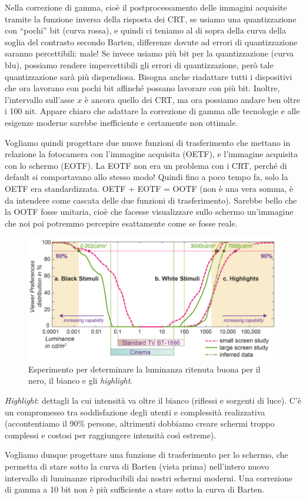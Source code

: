 \documentclass[a4paper,11pt]{article}
\begin{document}
Nella correzione di gamma, cioè il postprocessamento delle immagini acquisite tramite la funzione inversa della risposta dei CRT,
se usiamo una quantizzazione con ``pochi'' bit (curva rossa), e quindi ci teniamo al di sopra della curva della soglia del contrasto secondo Barten,
differenze dovute ad errori di quantizzazione saranno percettibili: male!
Se invece usiamo più bit per la quantizzazione (curva blu), possiamo rendere impercettibili gli errori di quantizzazione, però tale quantizzazione
sarà più dispendiosa. Bisogna anche riadattare tutti i dispositivi che ora lavorano con pochi bit
affinché possano lavorare con più bit. Inoltre, l'intervallo sull'asse $x$ è ancora quello dei CRT, ma ora possiamo andare ben oltre i 100 nit. Appare chiaro che adattare
la correzione di gamma alle tecnologie e alle esigenze moderne sarebbe inefficiente e certamente non ottimale.
\par
Vogliamo quindi progettare due nuove funzioni di trasferimento che mettano in relazione la fotocamera con l'immagine acquisita (OETF),
e l'immagine acquisita con lo schermo (EOTF). La EOTF non era un problema con i CRT,
perché di default si comportavano allo stesso modo! Quindi fino a poco tempo fa, solo la OETF era standardizzata.
OETF + EOTF = OOTF (non è una vera somma, è da intendere come cascata delle due funzioni di trasferimento).
Sarebbe bello che la OOTF fosse unitaria, cioè che facesse visualizzare sullo schermo un'immagine che noi poi potremmo percepire esattamente come se fosse reale.

\renewcommand{\thefigure}{4.23}
\begin{figure}[!h]
  \centering
    \includegraphics[scale=0.4]{images/4/bwh.png}
    \caption{Esperimento per determinare la luminanza ritenuta buona per il nero, il bianco e gli \textit{highlight}.}
\end{figure}

\textit{Highlight}: dettagli la cui intensità va oltre il bianco (riflessi e sorgenti di luce).
C'è un compromesso tra soddisfazione degli utenti e complessità realizzativa (accontentiamo il 90\% persone, altrimenti dobbiamo
creare schermi troppo complessi e costosi per raggiungere intensità così estreme).
\par
Vogliamo dunque progettare una funzione di trasferimento per lo schermo, che permetta di stare sotto la curva di Barten (vista prima) nell'intero nuovo intervallo di luminanze
riproducibili dai nostri schermi moderni. Una correzione di gamma a 10 bit non è più sufficiente a stare sotto la curva di Barten.
\end{document}
